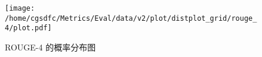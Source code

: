 \begin{figure}[H]%
\centering%
\texttt{[image: /home/cgsdfc/Metrics/Eval/data/v2/plot/distplot\_grid/rouge\_4/plot.pdf]}%
\caption{ROUGE{-}4 的概率分布图}%
\label{fig:ROUGE{-}4dist}%
\end{figure}